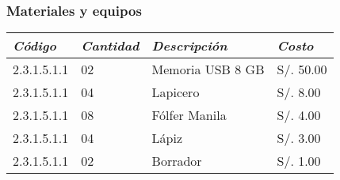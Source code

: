     \subsubsection{Materiales y equipos}
            \begin{table}[h!]
                \centering
                \begin{tabular}{|p{2.2cm}|p{1.8cm}|p{3.8cm}|p{2.2cm}|} \hline
                    
                
                \textit{{\bf{Código}}} &
                \textit{{\bf{Cantidad}}} &
                \textit{{\bf{Descripción}}} &
                \textit{{\bf{Costo}}}
                \\ \hline

                2.3.1.5.1.1 &
                02 &
                Memoria USB 8 GB &
                S/. 50.00
                \\ \hline

                2.3.1.5.1.1 &
                04 &
                Lapicero &
                S/. 8.00
                \\ \hline

                2.3.1.5.1.1 &
                08 &
                Fólfer Manila &
                S/. 4.00
                \\ \hline

                2.3.1.5.1.1 &
                04 &
                Lápiz &
                S/. 3.00
                \\ \hline

                2.3.1.5.1.1 &
                02 &
                Borrador &
                S/. 1.00
                \\ \hline


\end{tabular}
\end{table}
